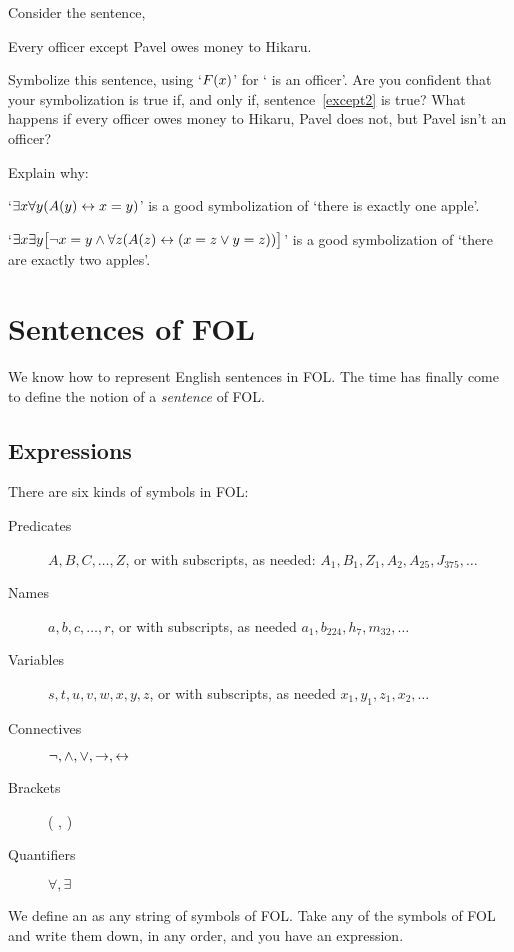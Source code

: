 \problempart Consider the sentence,
\begin{earg}
	\item[\ex{except2}] Every officer except Pavel owes money to Hikaru.
\end{earg}
Symbolize this sentence, using `$\mathord{F}(x)$' for ` is an officer'.  Are you confident that your symbolization is true if, and only if, sentence~\ref{except2} is true?  What happens if every officer owes money to Hikaru, Pavel does not, but Pavel isn't an officer?

\problempart Explain why:
	\begin{ebullet}
		\item   `$\exists x \forall y(\mathord{A}(y) \leftrightarrow x= y)$' is a good symbolization of `there is exactly one apple'.
		\item `$\exists x \exists y \bigl[\neg x = y \wedge \forall z(\mathord{A}(z) \leftrightarrow (x= z \vee y = z))\bigr]$' is a good symbolization of `there are exactly two apples'.
	\end{ebullet}		


\chapter{Sentences of FOL}\label{s:FOLSentences}
We know how to represent English sentences in FOL. The time has finally come to define the notion of a \emph{sentence} of FOL.

\section{Expressions}
There are six kinds of symbols in FOL:

\begin{description}
\item[Predicates] $A,B,C,\ldots,Z$, or 
with subscripts, as needed: $A_1, B_1,Z_1,A_2,A_{25},J_{375},\ldots$
\item[Names] $a,b,c,\ldots, r$, or
with subscripts, as needed $a_1, b_{224}, h_7, m_{32},\ldots$
\item[Variables] $s, t, u, v, w, x,y,z$, or
with subscripts, as needed $x_1, y_1, z_1, x_2,\ldots$
\item[Connectives]  $\neg,\wedge,\vee,\rightarrow,\leftrightarrow$
\item[Brackets] ( , )
\item[Quantifiers]  $\forall, \exists$
\end{description}
We define an  as any string of symbols of FOL. Take any of the symbols of FOL and write them down, in any order, and you have an expression.

